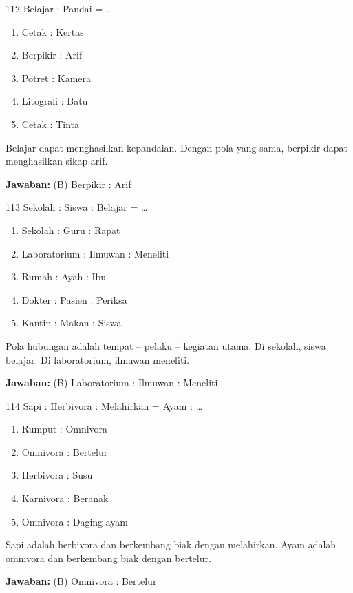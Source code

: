 \documentclass[11pt]{article}
\newenvironment{pil}{\begin{enumerate}[label=(\Alph*),leftmargin=*,itemsep=1pt,topsep=3pt]}{\end{enumerate}}
\newcommand{\jw}[1]{\par\smallskip\begin{jawbox}\textbf{Jawaban:} #1\end{jawbox}}
\begin{document}
\begin{soalbox}{1}{12}
Belajar : Pandai = \ldots
\begin{pil}\item Cetak : Kertas \item Berpikir : Arif \item Potret : Kamera \item Litografi : Batu \item Cetak : Tinta\end{pil}
\end{soalbox}
\begin{pembox}
Belajar dapat menghasilkan kepandaian. Dengan pola yang sama, berpikir dapat menghasilkan sikap arif.
\jw{(B) Berpikir : Arif}
\end{pembox}

\begin{soalbox}{1}{13}
Sekolah : Siswa : Belajar = \ldots
\begin{pil}\item Sekolah : Guru : Rapat \item Laboratorium : Ilmuwan : Meneliti \item Rumah : Ayah : Ibu \item Dokter : Pasien : Periksa \item Kantin : Makan : Siswa\end{pil}
\end{soalbox}
\begin{pembox}
Pola hubungan adalah tempat -- pelaku -- kegiatan utama. Di sekolah, siswa belajar. Di laboratorium, ilmuwan meneliti.
\jw{(B) Laboratorium : Ilmuwan : Meneliti}
\end{pembox}

\begin{soalbox}{1}{14}
Sapi : Herbivora : Melahirkan = Ayam : \ldots
\begin{pil}\item Rumput : Omnivora \item Omnivora : Bertelur \item Herbivora : Susu \item Karnivora : Beranak \item Omnivora : Daging ayam\end{pil}
\end{soalbox}
\begin{pembox}
Sapi adalah herbivora dan berkembang biak dengan melahirkan. Ayam adalah omnivora dan berkembang biak dengan bertelur.
\jw{(B) Omnivora : Bertelur}
\end{pembox}
\end{document}
